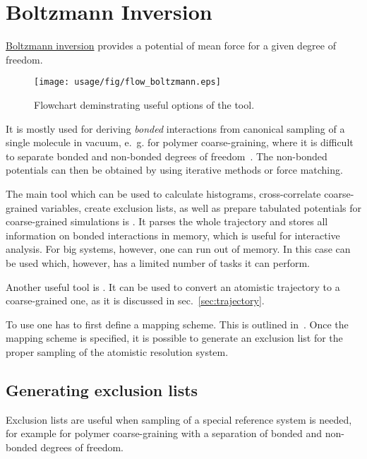 \chapter{Boltzmann Inversion}

\hyperref[sec:bi]{Boltzmann inversion} provides a potential of mean force for a given degree of freedom. 
%
\begin{wrapfigure}{t}{7cm}
   \centering
   \texttt{[image: usage/fig/flow\_boltzmann.eps]}
   \caption{Flowchart deminstrating useful options of the tool.}
\end{wrapfigure}
%
It is mostly used for deriving {\em bonded} interactions from canonical sampling of a single molecule in vacuum, e.~g. for polymer coarse-graining, where it is difficult to separate bonded and non-bonded degrees of freedom~\cite{Tschoep:1998}. The non-bonded potentials can then be obtained by using iterative  methods or force matching.

The main tool which can be used to calculate histograms, cross-correlate coarse-grained variables, create exclusion lists, as well as prepare tabulated potentials for coarse-grained simulations is .  It parses the whole trajectory and stores all information on bonded interactions in memory, which is useful for interactive analysis. For big systems, however, one can run out of memory. In this case  can be used which, however, has a limited number of tasks it can perform.

Another useful tool is . It can be used to convert an atomistic trajectory to a coarse-grained one, as it is discussed in sec.~\ref{sec:trajectory}.

To use  one has to first define a mapping scheme. This is outlined in~. Once the mapping scheme is specified, it is possible to generate an exclusion list for the proper sampling of the atomistic resolution system. 

\section{Generating exclusion lists}
\label{sec:exclusions}
Exclusion lists are useful when sampling of a special reference system is needed, for example for polymer coarse-graining with a separation of bonded and non-bonded degrees of freedom.

